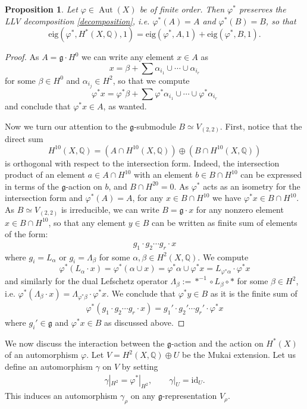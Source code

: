 \documentclass[a4paper,11pt]{amsart}
\newcommand{\Q}{{\mathbb Q}}
\newcommand{\eig}{{\mathrm{eig}}}
\newcommand{\V}[2]{V_{(#1,#2)}}
\newcommand{\kg}{{\mathfrak g}}
\newcommand{\Aut}{\operatorname{Aut}}
\theoremstyle{plain}
\newtheorem{proposition}[satz]{Proposition}
\theoremstyle{remark}
\begin{document}
    \begin{proposition}\label{prop:AB-eig}
        Let $\varphi\in \Aut (X)$ be of finite order. Then $\varphi^*$ preserves the LLV decomposition \eqref{decomposition}, i.e. $\varphi^*(A) = A$ and $\varphi^*(B) = B$, so that
        \[
        \eig (\varphi^*, H^*(X,\Q),1) = \eig (\varphi^*, A,1) + \eig(\varphi^*, B,1).
        \]
    \end{proposition}
    \begin{proof}
        As $A= \mathfrak g \cdot H^0$ we can write any element $x\in A$ as
        \[
        x = \beta + \sum \alpha_{i_1} \cup \cdots\cup \alpha_{i_r}
        \]
        for some $\beta\in H^0$ and $\alpha_{i_j}\in H^2$, so that we compute 
        \[
        \varphi^*x = \varphi^*\beta + \sum \varphi^*\alpha_{i_1} \cup \cdots\cup \varphi^*\alpha_{i_r}
        \]
        and conclude that $\varphi^* x\in A$, as wanted.

        Now we turn our attention to the $\kg$-submodule $B\simeq\V22$. First, notice that the direct sum
        \[
        H^{10}(X,\Q) = \left( A \cap H^{10}(X,\Q) \right) \oplus \left( B \cap H^{10}(X,\Q)\right)
        \]
        is orthogonal with respect to the intersection form. Indeed, the intersection product of an element $a\in A\cap H^{10}$ with an element $b\in B\cap H^{10}$ can be expressed in terms of the $\kg$-action on $b$, and \(B\cap H^{20}=0\).
        As $\varphi^*$ acts as an isometry for the intersection form and $\varphi^* (A) = A$, for any $x\in B \cap H^{10}$ we have $\varphi^* x\in B \cap H^{10}$. As $B\simeq\V22$ is irreducible, we can write $B = \mathfrak g \cdot x$ for any nonzero element $x\in B \cap H^{10}$, so that any element $y\in B$ can be written as finite sum of elements of the form:
\begin{align*}
    g_1\cdot g_2\cdots g_r \cdot x
\end{align*}
where $g_i=L_{\alpha}$ or $g_i=\Lambda_{\beta}$ for some $\alpha, \beta \in H^2(X,\mathbb Q)$.
        We compute
        \[
        \varphi^* (L_\alpha\cdot x) = \varphi^* (\alpha\cup x) = \varphi^* \alpha\cup \varphi^* x = L_{\varphi^* \alpha}\cdot \varphi^* x
        \] 
        and similarly for the dual Lefschetz operator $\Lambda_\beta := *^{-1}\circ L_\beta \circ *$ for some $\beta\in H^2$, i.e. $\varphi^*(\Lambda_\beta \cdot x) = \Lambda_{\varphi^*\beta} \cdot \varphi^* x$. We conclude that $\varphi^* y\in B$ as it is the finite sum of 
\begin{align*}
    \varphi^* (g_1\cdot g_2\cdots g_r \cdot x ) = g_1'\cdot g_2'\cdots g_r' \cdot \varphi^*x
\end{align*}
where $g_i'\in \kg$ and $\varphi^*x \in B$ as discussed above.
    \end{proof}
We now discuss the interaction between the $\kg$-action and the action on $H^*(X)$ of an automorphism $\varphi$.
Let $V = H^2(X,\Q) \oplus U$ be the Mukai extension. Let us define an automorphism $\gamma$ on $V$ by setting 
\begin{align}\label{eq:gamma}
    \gamma|_{H^2} = \varphi^*|_{H^2},\qquad \gamma|_U = \mathrm{id}_U.
\end{align}
This induces an automorphism $\gamma_\rho$ on any $\kg$-representation $V_\rho$. 
\end{document}
